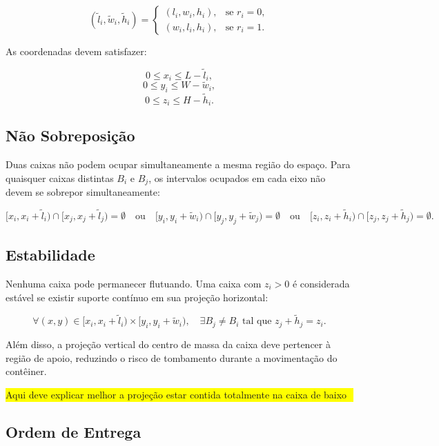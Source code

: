 \documentclass[12pt]{article}
\begin{document}
\[
(\tilde{l}_i, \tilde{w}_i, \tilde{h}_i) = 
\begin{cases}
(l_i, w_i, h_i), & \text{se } r_i = 0, \\
(w_i, l_i, h_i), & \text{se } r_i = 1.
\end{cases}
\]

As coordenadas devem satisfazer:

\[
0 \leq x_i \leq L - \tilde{l}_i,
\]
\[
0 \leq y_i \leq W - \tilde{w}_i,
\]
\[
0 \leq z_i \leq H - \tilde{h}_i.
\]

\subsection{Não Sobreposição}

Duas caixas não podem ocupar simultaneamente a mesma região do espaço. Para quaisquer caixas distintas $B_i$ e $B_j$, os intervalos ocupados em cada eixo não devem se sobrepor simultaneamente:

\[
[x_i, x_i+\tilde{l}_i) \cap [x_j, x_j+\tilde{l}_j) = \emptyset \quad \text{ou} \quad [y_i, y_i+\tilde{w}_i) \cap [y_j, y_j+\tilde{w}_j) = \emptyset \quad \text{ou} \quad [z_i, z_i+\tilde{h}_i) \cap [z_j, z_j+\tilde{h}_j) = \emptyset.
\]

\subsection{Estabilidade}

Nenhuma caixa pode permanecer flutuando. Uma caixa com $z_i > 0$ é considerada estável se existir suporte contínuo em sua projeção horizontal:

\[
\forall (x,y) \in [x_i, x_i+\tilde{l}_i) \times [y_i, y_i+\tilde{w}_i), \quad \exists B_j \neq B_i \text{ tal que } z_j + \tilde{h}_j = z_i.
\]

Além disso, a projeção vertical do centro de massa da caixa deve pertencer à região de apoio, reduzindo o risco de tombamento durante a movimentação do contêiner.

\colorbox{yellow}{
    \begin{minipage}{0.9\linewidth}
        Aqui deve explicar melhor a projeção estar contida totalmente na caixa de baixo
    \end{minipage}
}


\subsection{Ordem de Entrega}
\end{document}
